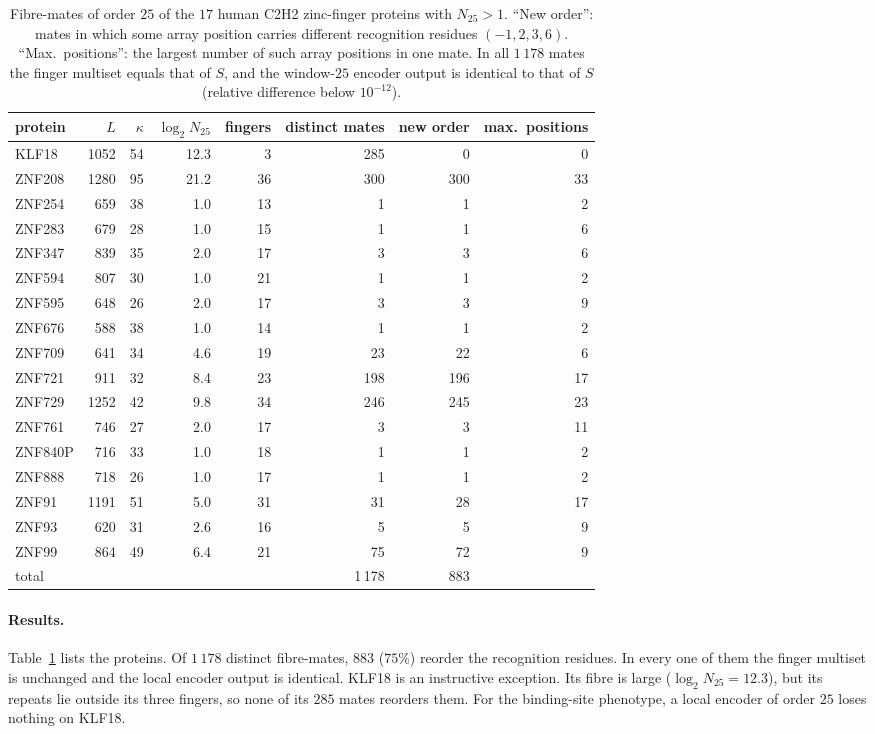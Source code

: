 \documentclass[11pt]{article}
\theoremstyle{plain}
\theoremstyle{definition}
\theoremstyle{remark}
\begin{document}
\begin{table}[t]
\centering\small
\begin{tabular}{lrrrrrrr}
\toprule
protein & $L$ & $\kappa$ & $\log_2N_{25}$ & fingers & distinct mates & new order & max.\ positions\\
\midrule
KLF18 & 1052 & 54 & 12.3 & 3 & 285 & 0 & 0\\
ZNF208 & 1280 & 95 & 21.2 & 36 & 300 & 300 & 33\\
ZNF254 & 659 & 38 & 1.0 & 13 & 1 & 1 & 2\\
ZNF283 & 679 & 28 & 1.0 & 15 & 1 & 1 & 6\\
ZNF347 & 839 & 35 & 2.0 & 17 & 3 & 3 & 6\\
ZNF594 & 807 & 30 & 1.0 & 21 & 1 & 1 & 2\\
ZNF595 & 648 & 26 & 2.0 & 17 & 3 & 3 & 9\\
ZNF676 & 588 & 38 & 1.0 & 14 & 1 & 1 & 2\\
ZNF709 & 641 & 34 & 4.6 & 19 & 23 & 22 & 6\\
ZNF721 & 911 & 32 & 8.4 & 23 & 198 & 196 & 17\\
ZNF729 & 1252 & 42 & 9.8 & 34 & 246 & 245 & 23\\
ZNF761 & 746 & 27 & 2.0 & 17 & 3 & 3 & 11\\
ZNF840P & 716 & 33 & 1.0 & 18 & 1 & 1 & 2\\
ZNF888 & 718 & 26 & 1.0 & 17 & 1 & 1 & 2\\
ZNF91 & 1191 & 51 & 5.0 & 31 & 31 & 28 & 17\\
ZNF93 & 620 & 31 & 2.6 & 16 & 5 & 5 & 9\\
ZNF99 & 864 & 49 & 6.4 & 21 & 75 & 72 & 9\\
\midrule
total & & & & & 1\,178 & 883 & \\
\bottomrule
\end{tabular}
\caption{Fibre-mates of order $25$ of the $17$ human C2H2 zinc-finger proteins with $N_{25}>1$. ``New order'': mates in
which some array position carries different recognition residues $(-1,2,3,6)$. ``Max.\ positions'': the largest number
of such array positions in one mate. In all $1\,178$ mates the finger multiset equals that of $S$, and the window-$25$
encoder output is identical to that of $S$ (relative difference below $10^{-12}$).}\label{tab:proteins}
\end{table}

\paragraph{Results.} Table~\ref{tab:proteins} lists the proteins. Of $1\,178$ distinct fibre-mates, $883$ ($75\%$)
reorder the recognition residues. In every one of them the finger multiset is unchanged and the local encoder
output is identical. KLF18 is an instructive exception. Its fibre is large ($\log_2N_{25}=12.3$), but its repeats lie
outside its three fingers, so none of its $285$ mates reorders them. For the binding-site phenotype, a local encoder of
order $25$ loses nothing on KLF18.
\end{document}
